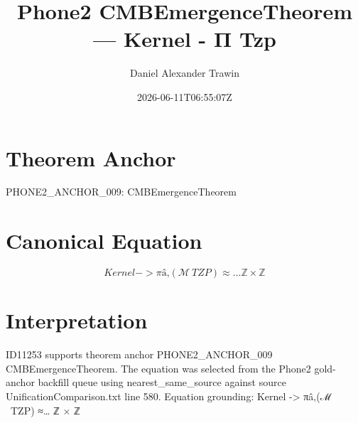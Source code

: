 \documentclass[11pt]{article}
\title{Phone2 CMBEmergenceTheorem — Kernel - Π Tzp}
\author{Daniel Alexander Trawin}
\date{2026-06-11T06:55:07Z}
\begin{document}
\maketitle
\section*{Theorem Anchor}
PHONE2_ANCHOR_009: CMBEmergenceTheorem
\section*{Canonical Equation}
\[
Kernel -> πâ‚(ℳ \ {TZP}) ≈… ℤ × ℤ
\]
\section*{Interpretation}
ID11253 supports theorem anchor PHONE2_ANCHOR_009 CMBEmergenceTheorem. The equation was selected from the Phone2 gold-anchor backfill queue using nearest_same_source against source UnificationComparison.txt line 580. Equation grounding: Kernel -> πâ‚(ℳ \ {TZP}) ≈… ℤ × ℤ
\end{document}
